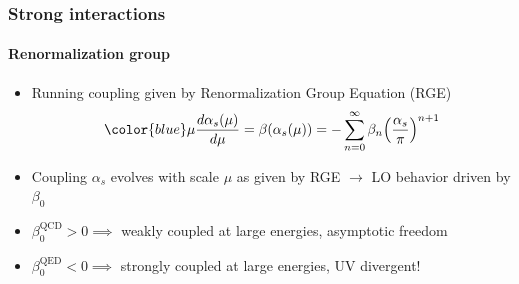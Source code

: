 \documentclass[aspectratio=43]{beamer}
\begin{document}
\begin{frame}

	\frametitle{Strong interactions}
	\framesubtitle{Renormalization group}
	
	\begin{itemize}
		\item Running coupling given by Renormalization Group Equation (RGE)
		\begin{equation}
			{\color{blue}\mu\frac{d\alpha_{s}(\mu)}{d\mu} = \beta(\alpha_{s}(\mu)) = -\sum_{n = 0}^{\infty} \beta_{n} \Big( \frac{\alpha_{s}}{\pi} \Big)^{n + 1}} \nonumber
		\end{equation}
		\item Coupling {\color{blue}$\alpha_{s}$} evolves with scale {\color{blue}$\mu$} as given by RGE $\rightarrow$ LO behavior driven by $\beta_{0}$
		\item $\beta_{0}^{\textrm{QCD}} > 0 \implies$ weakly coupled at large energies, asymptotic freedom
		\item $\beta_{0}^{\textrm{QED}} < 0 \implies$ strongly coupled at large energies, UV divergent!	
	\end{itemize}

\end{frame}
\end{document}
